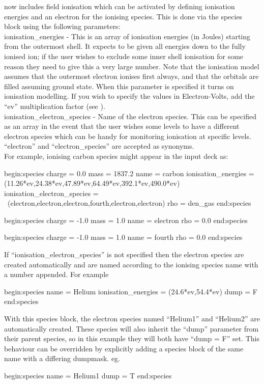 {\EPOCH} now includes field ionisation which can be activated by defining
ionisation energies and an electron for the ionising species. This is done
via the species block using the following parameters:\\

{\emphtext ionisation\_energies} - This is an array of ionisation energies
  (in Joules) starting from the outermost shell. It expects to be given all
  energies down to the fully ionised ion; if the user wishes to exclude some
  inner shell ionisation for some reason they need to give this a very large
  number. Note that the ionisation model assumes that the outermost electron
  ionises first always, and that the orbitals are filled assuming ground
  state. When this parameter is specified it turns on ionisation modelling.
  If you wish to specify the values in Electron-Volts, add the ``ev''
  multiplication factor (see ).\\

{\emphtext ionisation\_electron\_species} - Name of the electron species. This
  can be specified as an array in the event that the user wishes some levels
  to have a different electron species which can be handy for monitoring
  ionisation at specific levels. ``electron'' and ``electron\_species'' are
  accepted as synonyms.\\

For example, ionising carbon species might appear in the input deck as:

\begin{boxverbatim}
begin:species
   charge = 0.0
   mass = 1837.2
   name = carbon
   ionisation_energies = (11.26*ev,24.38*ev,47.89*ev,64.49*ev,392.1*ev,490.0*ev)
   ionisation_electron_species = \
       (electron,electron,electron,fourth,electron,electron)
   rho = den_gas
end:species

begin:species
   charge = -1.0
   mass = 1.0
   name = electron
   rho = 0.0
end:species

begin:species
   charge = -1.0
   mass = 1.0
   name = fourth
   rho = 0.0
end:species
\end{boxverbatim}

If ``ionisation\_electron\_species'' is not specified then the electron species
are created automatically and are named according to the ionising species name
with a number appended. For example
\begin{boxverbatim}
begin:species
   name = Helium
   ionisation_energies = (24.6*ev,54.4*ev)
   dump = F
end:species
\end{boxverbatim}
With this species block, the electron species named ``Helium1'' and ``Helium2''
are automatically created. These species will also inherit the ``dump''
parameter from their parent species, so in this example they will both have
``dump = F'' set. This behaviour can be overridden by explicitly
adding a species block of the same name with a differing dumpmask.
eg.
\begin{boxverbatim}
begin:species
   name = Helium1
   dump = T
end:species
\end{boxverbatim}



